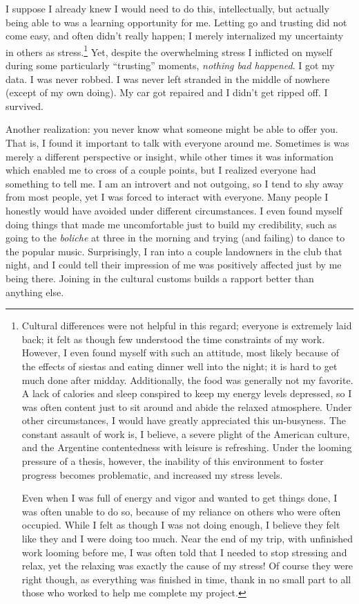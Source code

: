 I suppose I already knew I would need to do this, intellectually, but actually being able to was a learning opportunity for me. Letting go and trusting did not come easy, and often didn’t really happen; I merely internalized my uncertainty in others as stress.\footnote{Cultural differences were not helpful in this regard; everyone is extremely laid back; it felt as though few understood the time constraints of my work. However, I even found myself with such an attitude, most likely because of the effects of siestas and eating dinner well into the night; it is hard to get much done after midday. Additionally, the food was generally not my favorite. A lack of calories and sleep conspired to keep my energy levels depressed, so I was often content just to sit around and abide the relaxed atmosphere. Under other circumstances, I would have greatly appreciated this un-busyness. The constant assault of work is, I believe, a severe plight of the American culture, and the Argentine contentedness with leisure is refreshing. Under the looming pressure of a thesis, however, the inability of this environment to foster progress becomes problematic, and increased my stress levels.

Even when I was full of energy and vigor and wanted to get things done, I was often unable to do so, because of my reliance on others who were often occupied. While I felt as though I was not doing enough, I believe they felt like they and I were doing too much. Near the end of my trip, with unfinished work looming before me, I was often told that I needed to stop stressing and relax, yet the relaxing was exactly the cause of my stress! Of course they were right though, as everything was finished in time, thank in no small part to all those who worked to help me complete my project.} Yet, despite the overwhelming stress I inflicted on myself during some particularly “trusting” moments, \textit{nothing bad happened}. I got my data. I was never robbed. I was never left stranded in the middle of nowhere (except of my own doing). My car got repaired and I didn't get ripped off. I survived.

Another realization: you never know what someone might be able to offer you. That is, I found it important to talk with everyone around me. Sometimes is was merely a different perspective or insight, while other times it was information which enabled me to cross of a couple points, but I realized everyone had something to tell me. I am an introvert and not outgoing, so I tend to shy away from most people, yet I was forced to interact with everyone. Many people I honestly would have avoided under different circumstances. I even found myself doing things that made me uncomfortable just to build my credibility, such as going to the \textit{boliche} at three in the morning and trying (and failing) to dance to the popular music. Surprisingly, I ran into a couple landowners in the club that night, and I could tell their impression of me was positively affected just by me being there. Joining in the cultural customs builds a rapport better than anything else.

